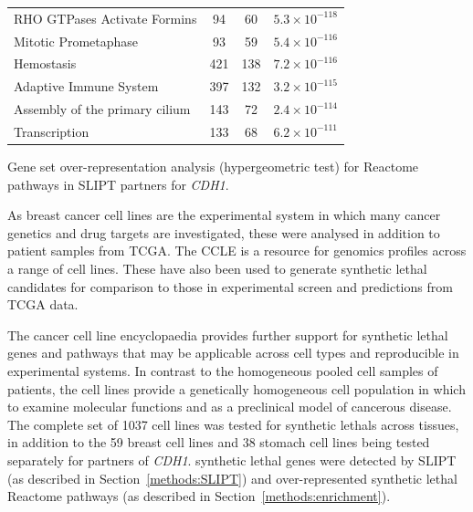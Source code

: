 \begin{table}[!b]
{\begin{threeparttable}
\begin{tabular}{lccc}
  \rowcolor{black!10}
  RHO GTPases Activate Formins &  94 &  60 & $5.3 \times 10^{-118}$ \\ 
  \rowcolor{black!5}
  Mitotic Prometaphase &  93 &  59 & $5.4 \times 10^{-116}$ \\ 
  \rowcolor{black!10}
  Hemostasis & 421 & 138 & $7.2 \times 10^{-116}$ \\ 
  \rowcolor{black!5}
  Adaptive Immune System & 397 & 132 & $3.2 \times 10^{-115}$ \\ 
  \rowcolor{black!10}
  Assembly of the primary cilium & 143 &  72 & $2.4 \times 10^{-114}$ \\ 
  \rowcolor{black!5}
  Transcription & 133 &  68 & $6.2 \times 10^{-111}$ \\ 
   \hline
\end{tabular}
\begin{tablenotes}
\raggedright %
Gene set over-representation analysis (hypergeometric test) for Reactome \glspl{pathway} in \gls{SLIPT} partners for \textit{CDH1}.
\end{tablenotes}
\end{threeparttable}
}
\end{table}

As breast cancer cell lines are the experimental system in which many cancer genetics and drug targets are investigated, these were analysed in addition to patient samples from \gls{TCGA}. The CCLE is a resource for \glspl{genomic} profiles across a range of cell lines. These have also been used to generate \gls{synthetic lethal} candidates for comparison to those in experimental screen and predictions from \gls{TCGA}  data.

The cancer cell line encyclopaedia provides further support for \gls{synthetic lethal} genes and \glspl{pathway} that may be applicable across cell types and reproducible in experimental systems. In contrast to the homogeneous pooled cell samples of patients,  the cell lines provide a genetically homogeneous cell population in which to examine molecular functions and as a preclinical model of cancerous disease. The complete set of 1037 cell lines was tested for \glspl{synthetic lethal} across tissues, in addition to the 59 breast cell lines and 38 stomach cell lines being tested separately for partners of \textit{CDH1}. \Gls{synthetic lethal} genes were detected by \gls{SLIPT} (as described in Section~\ref{methods:SLIPT}) and over-represented \gls{synthetic lethal} Reactome \glspl{pathway} (as described in Section~\ref{methods:enrichment}). 


